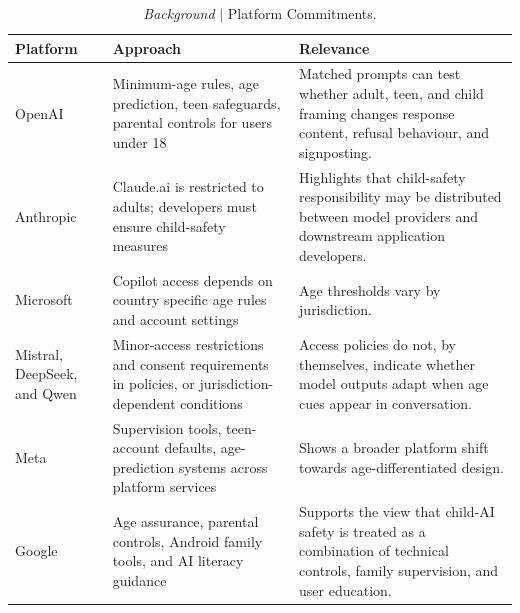 \begin{table}[htbp]
\centering
\small
\setlength{\tabcolsep}{5pt}
\renewcommand{\arraystretch}{1.15}
\begin{tabularx}{\textwidth}{@{}L{2.2cm}XX@{}}
\toprule
\textbf{Platform} & \textbf{Approach} & \textbf{Relevance} \\
\midrule
OpenAI &
Minimum-age rules, age prediction, teen safeguards, parental controls for users under 18 \cite{PrivacyPolicy, BuildingAgePrediction2026, OurApproachAge2025, IntroducingParentalControls2025, IntroducingTeenSafety2026, TeenSafetyFreedom2026} &
Matched prompts can test whether adult, teen, and child framing changes response content, refusal behaviour, and signposting. \\
\addlinespace
Anthropic &
Claude.ai is restricted to adults; developers must ensure child-safety measures \cite{ResponsibleUseAnthropics2026, TermsServiceConsumersa, AnthropicsTransparencyHub} &
Highlights that child-safety responsibility may be distributed between model providers and downstream application developers. \\
\addlinespace
Microsoft &
Copilot access depends on country specific age rules and account settings \cite{MicrosoftCopilotAge, ListCountriesRegions} &
Age thresholds vary by jurisdiction. \\
\addlinespace
Mistral, DeepSeek, and Qwen &
Minor-access restrictions and consent requirements in policies, or jurisdiction-dependent conditions \cite{UsagePolicyMistral, DeepSeekTermsUse, QwenPrivacyPolicy} &
Access policies do not, by themselves, indicate whether model outputs adapt when age cues appear in conversation. \\
\addlinespace
Meta &
Supervision tools, teen-account defaults, age-prediction systems across platform services \cite{isolomonsIntroducingInstagramTeen2024, isolomonsOurApproachTeen2025, ExpandingTeenAccount2025, joedamianiNewAIPoweredAge2026, joedamianiNewSupervisionTools2026, heatheraHelpingParentsUnderstand2026, heatheraNewAlertsLet2026} &
Shows a broader platform shift towards age-differentiated design. \\
\addlinespace
Google &
Age assurance, parental controls, Android family tools, and AI literacy guidance \cite{BuildInternetYoung2025, PolicyFrameworkProtect2023, GuidingAIGeneration2026, 6TakeawaysOur2026, NewExpandedAndroid2026} &
Supports the view that child-AI safety is treated as a combination of technical controls, family supervision, and user education. \\
\bottomrule
\end{tabularx}
\caption{\emph{Background} $\vert$ Platform Commitments.}
\label{tab:provider_policy_mapping}
\end{table}
